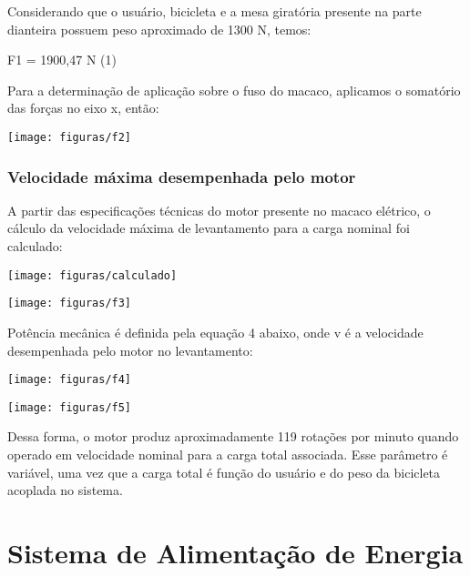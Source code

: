 Considerando que o usuário, bicicleta e a mesa giratória presente na parte dianteira possuem peso aproximado de 1300 N, temos:

          F1 = 1900,47 N       (1)

Para a determinação de aplicação sobre o fuso do macaco, aplicamos o somatório das forças no eixo x, então:

                       \begin{center}
    	\texttt{[image: figuras/f2]}
                \label{f2}
    \end{center}

\subsubsection{Velocidade máxima desempenhada pelo motor}

 A partir das especificações técnicas do motor presente no macaco elétrico, o cálculo da velocidade máxima de levantamento para a carga nominal foi calculado:

 \begin{center}
      \texttt{[image: figuras/calculado]}
        \label{calculado}
    \end{center}

    \begin{center}
      \texttt{[image: figuras/f3]}
                \label{f3}
    \end{center}

Potência mecânica é definida pela equação 4 abaixo, onde v é a velocidade desempenhada pelo motor no levantamento:


    \begin{center}
      \texttt{[image: figuras/f4]}
                \label{f4}
    \end{center}

    \begin{center}
      \texttt{[image: figuras/f5]}
                \label{f5}
    \end{center}

Dessa forma, o motor produz aproximadamente 119 rotações por minuto quando operado em velocidade nominal para a carga total associada. Esse parâmetro é variável, uma vez que a carga total é função do usuário e do peso da bicicleta acoplada no sistema.


\section{Sistema de Alimentação de Energia }

